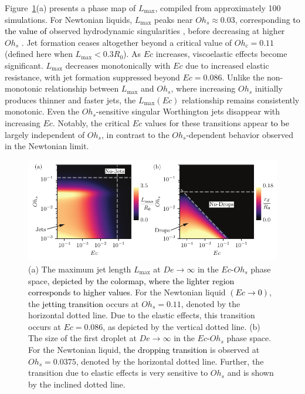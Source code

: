 \documentclass{jfm}
\newcommand{\DL}[1]{{\textcolor{black}{#1}}}
\newcommand{\VS}[1]{{\textcolor{black}{#1}}}
\newcommand{\AO}[1]{{\textcolor{black}{#1}}}
\newcommand{\AKD}[1]{{\textcolor{black}{#1}}}
\begin{document}
Figure~\ref{highDe}(a) presents a phase map of $L_{\text{max}}$, compiled from approximately 100 simulations.
For Newtonian liquids, $L_{\text{max}}$ peaks near $Oh_s \approx 0.03$, corresponding \AO{to the value of} observed hydrodynamic singularities \citep{zeff2000singularity,lohse2003bubble,eggers2015singularities,yang2020multitude}, before decreasing at higher $Oh_s$ \citep{duchemin2002jet,deike2018dynamics,gordillo2019capillary}.
Jet formation ceases altogether beyond a critical value of $Oh_c = 0.11$ \citep{sanjay2021bursting} (defined here when $L_\text{max} < 0.3R_0$).
As $Ec$ increases, viscoelastic effects become significant. $L_{\text{max}}$ decreases monotonically with $Ec$ due to increased elastic resistance, with jet formation suppressed beyond $Ec=0.086$. Unlike the non-monotonic relationship between $L_{\text{max}}$ and $Oh_s$, where increasing $Oh_s$ initially produces thinner and faster jets, the $L_{\text{max}}(Ec)$ relationship remains consistently monotonic. Even the $Oh_s$-sensitive singular Worthington jets disappear with increasing $Ec$. Notably, the critical $Ec$ values for these transitions appear \DL{to be} largely independent of $Oh_s$, in contrast to the $Oh_s$-dependent behavior observed in the Newtonian limit.

\begin{figure}
	\includegraphics[width=\textwidth]{High_De_05-eps-converted-to.pdf}
	\caption{(a) The maximum jet length $L_{\text{max}}$ at $De \to \infty$ in the $Ec$-$Oh_s$ phase space\AKD{, depicted by the colormap, where the lighter region corresponds to higher values}. For the Newtonian liquid \DL{$\left(Ec \to 0\right)$}, the \VS{jetting transition} occurs at $Oh_s = 0.11$, denoted by the horizontal dotted line. Due to the elastic effect\AO{s}, this transition occurs at $Ec = 0.086$, as depicted by the vertical dotted line. (b) The size of the first droplet at $De \to \infty$ in the $Ec$-$Oh_s$ phase space. For the Newtonian liquid, \VS{the dropping transition} is observed at $Oh_s = 0.0375$, denoted by the horizontal dotted line. Further, the transition due to elastic effects is very sensitive to $Oh_s$ and is shown by the inclined dotted line.}
	\label{highDe}
\end{figure}
\end{document}
